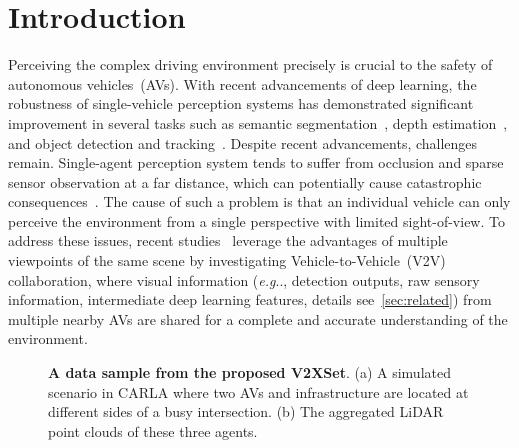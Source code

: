 \documentclass[runningheads]{llncs}
\makeatletter
\DeclareRobustCommand\onedot{\futurelet\@let@token\@onedot}
\def\@onedot{\ifx\@let@token.\else.\null\fi\xspace}
\def\eg{\emph{e.g}\onedot} \def\Eg{\emph{E.g}\onedot}
\makeatother
\begin{document}
\section{Introduction}
\label{sec:intro}
Perceiving the complex driving environment precisely is crucial to the safety of autonomous vehicles~(AVs). With recent advancements of deep learning, the robustness of single-vehicle perception systems has demonstrated significant improvement in several tasks such as semantic segmentation~\cite{treml2016speeding,el2019rgb}, depth estimation~\cite{zhou2021r,9826399}, and object detection and tracking~\cite{lang2019pointpillars,liang2018deep,zhao2022track,fan2021deep}. Despite recent advancements, challenges remain. Single-agent perception system tends to suffer from occlusion and sparse sensor observation at a far distance, which can potentially cause catastrophic consequences~\cite{zhang2021safe}. The cause of such a problem is that an individual vehicle can only perceive the environment from a single perspective with limited sight-of-view. To address these issues, recent studies~\cite{wang2020v2vnet,chen2019cooper,xu2021opv2v,chen2019f,yuan2022keypoints,lei2022latency} leverage the advantages of multiple viewpoints of the same scene by investigating Vehicle-to-Vehicle~(V2V) collaboration, where visual information (\eg, detection outputs, raw sensory information, intermediate deep learning features, details see~\cref{sec:related}) from multiple nearby AVs are shared for a complete and accurate understanding of the environment.

\begin{figure}[!t]
\centering
{}
\hfil
{}
\caption{\textbf{A data sample from the proposed V2XSet}. (a) A simulated scenario in CARLA where two AVs and infrastructure are located at different sides of a busy intersection. (b) The aggregated LiDAR point clouds of these three agents.}
\label{fig:data_sample}
\vspace{-4mm}
\end{figure}
\end{document}
